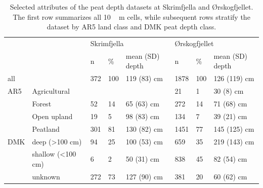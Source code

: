 \documentclass[soil, manuscript]{copernicus}
\begin{document}
\begin{table}[h]
\caption{Selected attributes of the peat depth datasets at Skrimfjella and Ørskogfjellet. The first row summarizes all \unit{10\,m} cells, while subsequent rows stratify the dataset by AR5 land class and DMK peat depth class.}
\begin{tabular}{llllllll}
\hline
    &                             & \multicolumn{3}{l}{Skrimfjella} & \multicolumn{3}{l}{Ørskogfjellet} \\ \cline{3-8} 
    &                             & n     & \%   & mean (SD) depth  & n      & \%    & mean (SD) depth  \\ \cline{3-8} 
all &                             & 372   & 100  & 119 (83) cm      & 1878   & 100   & 126 (119) cm     \\
AR5 & Agricultural                &       &      &                  & 21     & 1     & 30 (8) cm        \\
    & Forest                      & 52    & 14   & 65 (63) cm       & 272    & 14    & 71 (68) cm       \\
    & Open upland                 & 19    & 5    & 98 (83) cm       & 134    & 7     & 39 (21) cm       \\
    & Peatland                    & 301   & 81   & 130 (82) cm      & 1451   & 77    & 145 (125) cm     \\
DMK & deep (\textgreater{}100 cm) & 94    & 25   & 100 (53) cm      & 659    & 35    & 219 (143) cm     \\
    & shallow (\textless{}100 cm) & 6     & 2    & 50 (31) cm       & 838    & 45    & 82 (54) cm       \\
    & unknown                     & 272   & 73   & 127 (90) cm      & 381    & 20    & 60 (62) cm       \\ \hline
\end{tabular}
\label{tab:depthsByClass}
\end{table}
\end{document}
